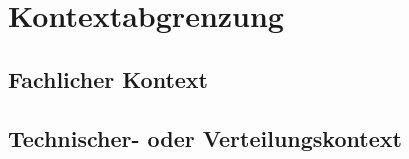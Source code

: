 \section{Kontextabgrenzung}

\subsection{Fachlicher Kontext}


\subsection{Technischer- oder Verteilungskontext}

